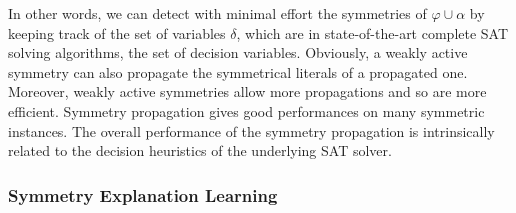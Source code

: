 In other words, we can detect with minimal effort the symmetries of $\varphi
\cup \alpha$ by keeping track of the set of variables $\delta$, which are 
in state-of-the-art complete SAT solving algorithms, the set of decision variables.
Obviously, a weakly active symmetry can also propagate the symmetrical literals of a propagated one.
Moreover, weakly active symmetries allow more propagations and so are more efficient.
Symmetry propagation gives good performances on many symmetric instances.
The overall performance of the symmetry propagation is intrinsically related to the decision heuristics of the underlying SAT solver.
\subsubsection{Symmetry Explanation Learning}



